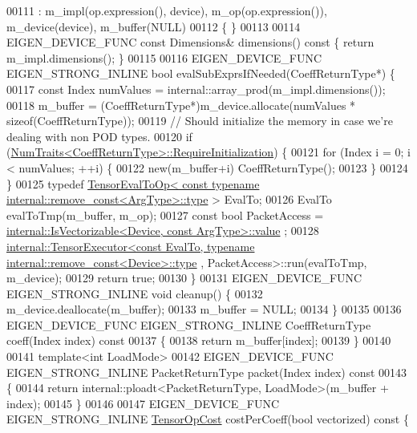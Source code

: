 \begin{DoxyCode}
00111       : m\_impl(op.expression(), device), m\_op(op.expression()), m\_device(device), m\_buffer(NULL)
00112   \{ \}
00113 
00114   EIGEN\_DEVICE\_FUNC \textcolor{keyword}{const} Dimensions& dimensions()\textcolor{keyword}{ const }\{ \textcolor{keywordflow}{return} m\_impl.dimensions(); \}
00115 
00116   EIGEN\_DEVICE\_FUNC EIGEN\_STRONG\_INLINE \textcolor{keywordtype}{bool} evalSubExprsIfNeeded(CoeffReturnType*) \{
00117     \textcolor{keyword}{const} Index numValues =  internal::array\_prod(m\_impl.dimensions());
00118     m\_buffer = (CoeffReturnType*)m\_device.allocate(numValues * \textcolor{keyword}{sizeof}(CoeffReturnType));
00119     \textcolor{comment}{// Should initialize the memory in case we're dealing with non POD types.}
00120     \textcolor{keywordflow}{if} (\hyperlink{group___core___module_struct_eigen_1_1_num_traits}{NumTraits<CoeffReturnType>::RequireInitialization})
       \{
00121       \textcolor{keywordflow}{for} (Index i = 0; i < numValues; ++i) \{
00122         \textcolor{keyword}{new}(m\_buffer+i) CoeffReturnType();
00123       \}
00124     \}
00125     \textcolor{keyword}{typedef} \hyperlink{class_eigen_1_1_tensor_eval_to_op}{TensorEvalToOp< const typename internal::remove\_const<ArgType>::type}
       > EvalTo;
00126     EvalTo evalToTmp(m\_buffer, m\_op);
00127     \textcolor{keyword}{const} \textcolor{keywordtype}{bool} PacketAccess = 
      \hyperlink{struct_eigen_1_1internal_1_1_is_vectorizable}{internal::IsVectorizable<Device, const ArgType>::value}
      ;
00128     
      \hyperlink{class_eigen_1_1internal_1_1_tensor_executor}{internal::TensorExecutor<const EvalTo, typename internal::remove\_const<Device>::type}
      , PacketAccess>::run(evalToTmp, m\_device);
00129     \textcolor{keywordflow}{return} \textcolor{keyword}{true};
00130   \}
00131   EIGEN\_DEVICE\_FUNC EIGEN\_STRONG\_INLINE \textcolor{keywordtype}{void} cleanup() \{
00132     m\_device.deallocate(m\_buffer);
00133     m\_buffer = NULL;
00134   \}
00135 
00136   EIGEN\_DEVICE\_FUNC EIGEN\_STRONG\_INLINE CoeffReturnType coeff(Index index)\textcolor{keyword}{ const}
00137 \textcolor{keyword}{  }\{
00138     \textcolor{keywordflow}{return} m\_buffer[index];
00139   \}
00140 
00141   \textcolor{keyword}{template}<\textcolor{keywordtype}{int} LoadMode>
00142   EIGEN\_DEVICE\_FUNC EIGEN\_STRONG\_INLINE PacketReturnType packet(Index index)\textcolor{keyword}{ const}
00143 \textcolor{keyword}{  }\{
00144     \textcolor{keywordflow}{return} internal::ploadt<PacketReturnType, LoadMode>(m\_buffer + index);
00145   \}
00146 
00147   EIGEN\_DEVICE\_FUNC EIGEN\_STRONG\_INLINE \hyperlink{class_eigen_1_1_tensor_op_cost}{TensorOpCost} costPerCoeff(\textcolor{keywordtype}{bool} vectorized)\textcolor{keyword}{ const }\{

\end{DoxyCode}
